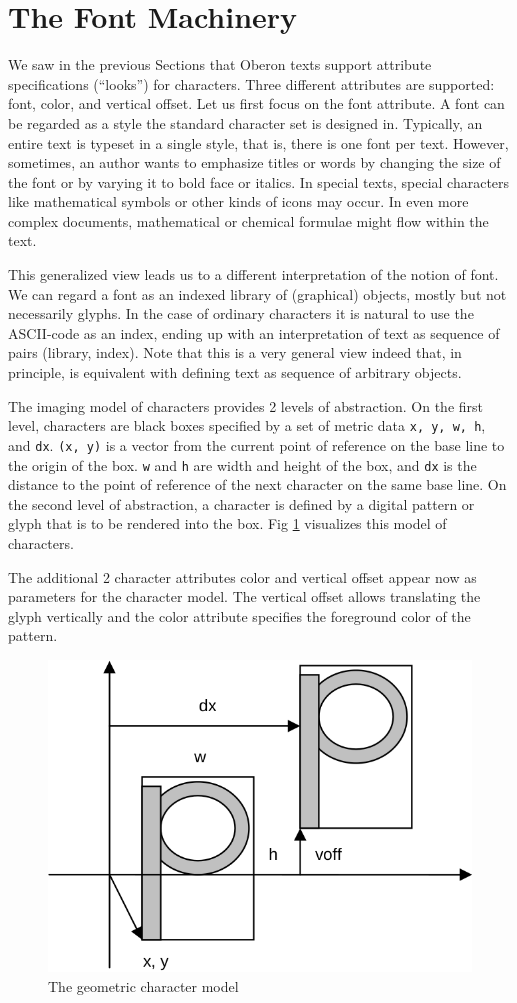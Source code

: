 \section{The Font Machinery}
\label{sec:fontmachinery}
We saw in the previous Sections that Oberon texts support attribute specifications (“looks”) for
characters. Three different attributes are supported: font, color, and vertical offset. Let us first
focus on the font attribute. A font can be regarded as a style the standard character set is designed in.
Typically, an entire text is typeset in a single style, that is, there is one font per text. However,
sometimes, an author wants to emphasize titles or words by changing the size of the font or by
varying it to bold face or italics. In special texts, special characters like mathematical symbols or
other kinds of icons may occur. In even more complex documents, mathematical or chemical formulae
might flow within the text.

This generalized view leads us to a different interpretation of the notion of font. We can regard a
font as an indexed library of (graphical) objects, mostly but not necessarily glyphs. In the case of
ordinary characters it is natural to use the ASCII-code as an index, ending up with an interpretation
of text as sequence of pairs (library, index). Note that this is a very general view indeed that, in
principle, is equivalent with defining text as sequence of arbitrary objects.

The imaging model of characters provides 2 levels of abstraction. On the first level, characters are
black boxes specified by a set of metric data \verb|x, y, w, h|, and \verb|dx|. \verb|(x, y)| is a
vector from the current point of reference on the base line to the origin of the box. \verb|w| and
\verb|h| are width and height of the box, and \verb|dx| is the distance to the point of reference of
the next character on the same base line. On the second level of abstraction, a character is defined
by a digital pattern or glyph that is to be rendered into the box. Fig \ref{fig:character} visualizes
this model of characters.

The additional 2 character attributes color and vertical offset appear now as parameters for the
character model. The vertical offset allows translating the glyph vertically and the color attribute
specifies the foreground color of the pattern.
\begin{figure}[h!]
  \centering
  \includegraphics[width=.7\textwidth]{i/i}
  \caption{The geometric character model}
  \label{fig:character}
\end{figure}


